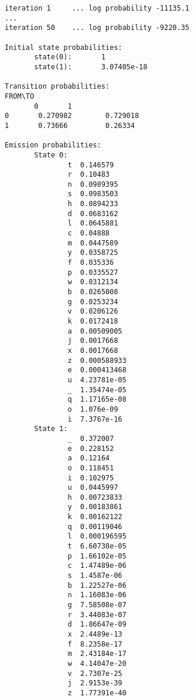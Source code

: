 \begin{verbatim}
iteration 1     ... log probability -11135.1
...
iteration 50    ... log probability -9220.35

Initial state probabilities:
       state(0):       1
       state(1):       3.07405e-18

Transition probabilities:
FROM\TO
       0       1
0       0.270982        0.729018
1       0.73666         0.26334

Emission probabilities:
       State 0:
               t  0.146579
               r  0.10483
               n  0.0989395
               s  0.0983503
               h  0.0894233
               d  0.0683162
               l  0.0645881
               c  0.04888
               m  0.0447589
               y  0.0358725
               f  0.035336
               p  0.0335527
               w  0.0312134
               b  0.0265008
               g  0.0253234
               v  0.0206126
               k  0.0172418
               a  0.00509005
               j  0.0017668
               x  0.0017668
               z  0.000588933
               e  0.000413468
               u  4.23781e-05
               _  1.35474e-05
               q  1.17165e-08
               o  1.076e-09
               i  7.3767e-16
       State 1:
               _  0.372007
               e  0.228152
               a  0.12164
               o  0.118451
               i  0.102975
               u  0.0445997
               h  0.00723833
               y  0.00183861
               k  0.00162122
               q  0.00119046
               l  0.000196595
               t  6.60738e-05
               p  1.66102e-05
               c  1.47489e-06
               s  1.4587e-06
               b  1.22527e-06
               n  1.16083e-06
               g  7.58508e-07
               r  3.44083e-07
               d  1.86647e-09
               x  2.4489e-13
               f  8.2358e-17
               m  2.43184e-17
               w  4.14047e-20
               v  2.7307e-25
               j  2.9153e-39
               z  1.77391e-40
\end{verbatim}